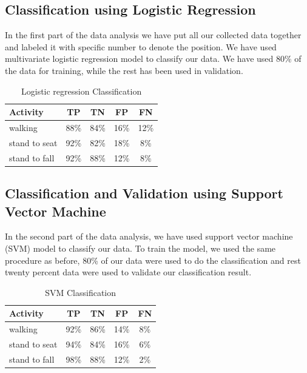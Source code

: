 \documentclass[letterpaper]{article}
\begin{document}
\subsection{Classification using Logistic Regression}

In the first part of the data analysis we have put all our collected data together and labeled it
with specific number to denote the position. We have used multivariate logistic regression model to
classify our data. We have used 80\% of the data for training, while the rest has been used
in validation.


\begin{table}[!ht]
\caption{Logistic regression Classification}
	\label{tab:human-logistic-class}
	\centering
		\begin{tabular} {|l |c |c |c|c|}
			\hline
			{\bf Activity} & {\bf  TP}  &	{\bf TN}  &	{\bf FP} &	{\bf FN} \\ 
			\hline
			walking	& 88\%	& 84\%	& 16\%	& 12\% \\ \hline
			stand to seat	& 92\%	& 82\%	& 18\% & 	8\%	 \\ \hline 
			stand to fall	& 92\%	& 88\%	& 12\%	& 8\%	 \\ \hline
		\end{tabular}
\end{table}




\subsection{Classification and Validation using Support Vector Machine}

In the second part of the data analysis, we have used support vector machine (SVM) model
to classify our data. To train the model, we used the same procedure as before, 80\% of
our data were used to do the classification and rest twenty percent data were used to validate our
classification result.




\begin{table}[!ht]
\caption{SVM Classification}
	\label{tab:human-svm-class}
	\centering
		\begin{tabular} {|l |c |c |c|c|}
			\hline
			{\bf Activity} & {\bf  TP}  &	{\bf TN}  &	{\bf FP} &	{\bf FN} \\ 
			\hline
			walking	& 92\%	& 86\%	& 14\%	& 8\% \\ \hline
			stand to seat	& 94\%	& 84\%	& 16\% & 	6\%	 \\ \hline 
			stand to fall	& 98\%	& 88\%	& 12\%	& 2\%	 \\ \hline
		\end{tabular}
\end{table}
\end{document}
